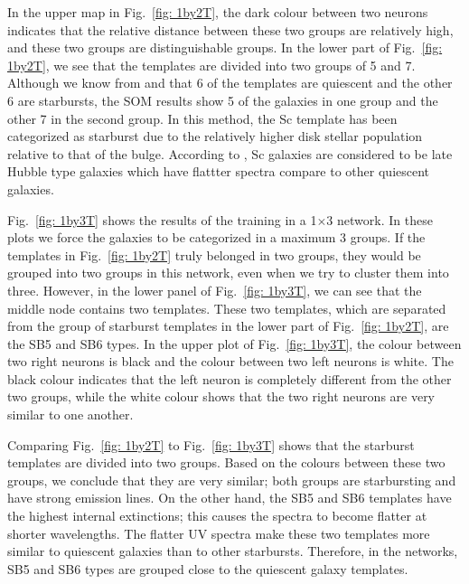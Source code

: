         
            In the upper map in Fig.~\ref{fig: 1by2T}, the dark colour between two neurons indicates that the relative distance between these two groups are relatively high, and these two groups are distinguishable groups.
            In the lower part of Fig.~\ref{fig: 1by2T}, we see that the templates are divided into two groups of 5 and 7.
            Although we know from  and  that 6 of the templates are quiescent and the other 6 are starbursts, the SOM results show 5 of the galaxies in one group and the other 7 in the second group.
            In this method, the Sc template has been categorized as starburst due to the relatively higher disk stellar population relative to that of the bulge. 
            According to , Sc galaxies are considered to be late Hubble type galaxies which have  flattter spectra compare to other quiescent galaxies. 
            

            Fig.~\ref{fig: 1by3T} shows the results of the training in a 1$\times$3 network.
            In these plots we force the galaxies to be categorized in a maximum 3 groups. 
            If the templates in Fig.~\ref{fig: 1by2T} truly belonged in two groups, they would be grouped into two groups in this network, even when we try to cluster them into three. 
            However, in the lower panel of Fig.~\ref{fig: 1by3T}, we can see that the middle node contains two templates.
            These two templates, which are separated from the group of starburst templates in the lower part of Fig.~\ref{fig: 1by2T},  are the SB5 and SB6 types.
            In the upper plot of Fig.~\ref{fig: 1by3T}, the colour between two right neurons is black and the colour between two left neurons is white. 
            The black colour indicates that the left neuron is completely different from the other two groups,
            while the white colour shows that the two right neurons are very similar to one another. 
            
            Comparing Fig.~\ref{fig: 1by2T} to Fig.~\ref{fig: 1by3T} shows that the starburst templates are divided into two groups. 
            Based on the colours between these two groups, we conclude that they are very similar; both groups are starbursting and have strong emission lines.
            On the other hand, the SB5 and SB6 templates have the highest internal extinctions; this causes the spectra to become flatter at shorter wavelengths. 
            The flatter UV spectra make these two templates more similar to quiescent galaxies than to other starbursts.
            Therefore, in the networks, SB5 and SB6 types are grouped close to the quiescent galaxy templates.
                

